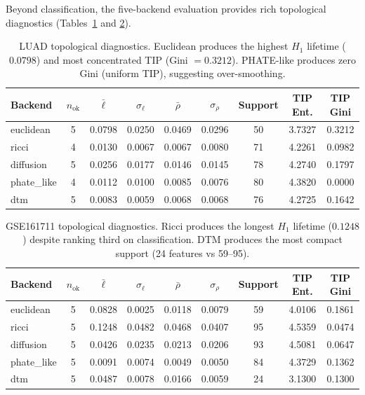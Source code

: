 \documentclass[12pt]{article}
\begin{document}
Beyond classification, the five-backend evaluation provides rich topological diagnostics (Tables~\ref{tab:diag_luad} and \ref{tab:diag_gse}).

\begin{table}[h]
\centering
\small
\begin{tabular}{@{}lcccccccc@{}}
\toprule
Backend & $n_{\text{ok}}$ & $\bar{\ell}$ & $\sigma_\ell$ & $\bar{\rho}$ & $\sigma_\rho$ & Support & TIP Ent. & TIP Gini \\
\midrule
euclidean & 5 & 0.0798 & 0.0250 & 0.0469 & 0.0296 & 50 & 3.7327 & 0.3212 \\
ricci & 4 & 0.0130 & 0.0067 & 0.0067 & 0.0080 & 71 & 4.2261 & 0.0982 \\
diffusion & 5 & 0.0256 & 0.0177 & 0.0146 & 0.0145 & 78 & 4.2740 & 0.1797 \\
phate\_like & 4 & 0.0112 & 0.0100 & 0.0085 & 0.0076 & 80 & 4.3820 & 0.0000 \\
dtm & 5 & 0.0083 & 0.0059 & 0.0068 & 0.0068 & 76 & 4.2725 & 0.1642 \\
\bottomrule
\end{tabular}
\caption{LUAD topological diagnostics. Euclidean produces the highest $H_1$ lifetime ($0.0798$) and most concentrated TIP (Gini $= 0.3212$). PHATE-like produces zero Gini (uniform TIP), suggesting over-smoothing.}
\label{tab:diag_luad}
\end{table}

\begin{table}[h]
\centering
\small
\begin{tabular}{@{}lcccccccc@{}}
\toprule
Backend & $n_{\text{ok}}$ & $\bar{\ell}$ & $\sigma_\ell$ & $\bar{\rho}$ & $\sigma_\rho$ & Support & TIP Ent. & TIP Gini \\
\midrule
euclidean & 5 & 0.0828 & 0.0025 & 0.0118 & 0.0079 & 59 & 4.0106 & 0.1861 \\
ricci & 5 & 0.1248 & 0.0482 & 0.0468 & 0.0407 & 95 & 4.5359 & 0.0474 \\
diffusion & 5 & 0.0426 & 0.0235 & 0.0213 & 0.0206 & 93 & 4.5081 & 0.0647 \\
phate\_like & 5 & 0.0091 & 0.0074 & 0.0049 & 0.0050 & 84 & 4.3729 & 0.1362 \\
dtm & 5 & 0.0487 & 0.0078 & 0.0166 & 0.0059 & 24 & 3.1300 & 0.1300 \\
\bottomrule
\end{tabular}
\caption{GSE161711 topological diagnostics. Ricci produces the longest $H_1$ lifetime ($0.1248$) despite ranking third on classification. DTM produces the most compact support (24 features vs 59--95).}
\label{tab:diag_gse}
\end{table}
\end{document}
